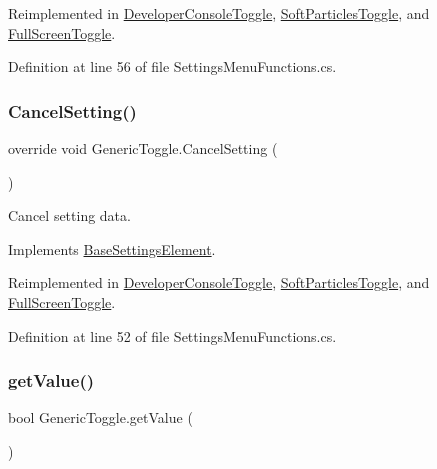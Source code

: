 Reimplemented in \hyperlink{class_developer_console_toggle_a5b3b9f9e622a31e8a1ad4675d920b454}{Developer\+Console\+Toggle}, \hyperlink{class_soft_particles_toggle_a19138a1f7285d6d416ef7b62a3176e9e}{Soft\+Particles\+Toggle}, and \hyperlink{class_full_screen_toggle_ae4c6b14c9e106e2d2749b28808a9bd6c}{Full\+Screen\+Toggle}.



Definition at line 56 of file Settings\+Menu\+Functions.\+cs.

\mbox{\label{class_generic_toggle_a11d9c35a3c20308376d1a126c3bfc874}} 
\subsubsection{\texorpdfstring{Cancel\+Setting()}{CancelSetting()}}
{\footnotesize\ttfamily override void Generic\+Toggle.\+Cancel\+Setting (\begin{DoxyParamCaption}{ }\end{DoxyParamCaption})\hspace{0.3cm}{\ttfamily [virtual]}}



Cancel setting data. 



Implements \hyperlink{class_base_settings_element_a66f796e4aaa1e660a7db3e69547412d3}{Base\+Settings\+Element}.



Reimplemented in \hyperlink{class_developer_console_toggle_a7621c9152f401719538ba3008f3dcfd2}{Developer\+Console\+Toggle}, \hyperlink{class_soft_particles_toggle_a60520a7db08f28059e7407110749c2f6}{Soft\+Particles\+Toggle}, and \hyperlink{class_full_screen_toggle_a6f9140dc1331393df37ad10944831eae}{Full\+Screen\+Toggle}.



Definition at line 52 of file Settings\+Menu\+Functions.\+cs.

\mbox{\label{class_generic_toggle_a86ef0ed30fdcb26b5a0c9e2e06590cda}} 
\subsubsection{\texorpdfstring{get\+Value()}{getValue()}}
{\footnotesize\ttfamily bool Generic\+Toggle.\+get\+Value (\begin{DoxyParamCaption}{ }\end{DoxyParamCaption})}



